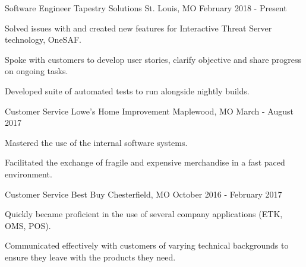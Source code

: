 

\begin{cventries}


  \cventry
    {Software Engineer} %
    {Tapestry Solutions} %
    {St. Louis, MO} %
    {February 2018 - Present} %
    {
      \begin{cvitems} %
        \item {Solved issues with and created new features for Interactive Threat Server technology, OneSAF.}
        \item {Spoke with customers to develop user stories, clarify objective and share progress on ongoing tasks.}
        \item {Developed suite of automated tests to run alongside nightly builds.}
      \end{cvitems}
    }

  \cventry
    {Customer Service} %
    {Lowe's Home Improvement} %
    {Maplewood, MO} %
    {March - August 2017} %
    {
      \begin{cvitems} %
        \item {Mastered the use of the internal software systems.}
        \item {Facilitated the exchange of fragile and expensive merchandise in a fast paced environment.}
      \end{cvitems}
    }

  \cventry
    {Customer Service} %
    {Best Buy} %
    {Chesterfield, MO} %
    {October 2016 - February 2017} %
    {
      \begin{cvitems} %
        \item {Quickly became proficient in the use of several company applications (ETK, OMS, POS).}
        \item {Communicated effectively with customers of varying technical backgrounds to ensure they leave with the products they need.}
      \end{cvitems}
    }

\end{cventries}
